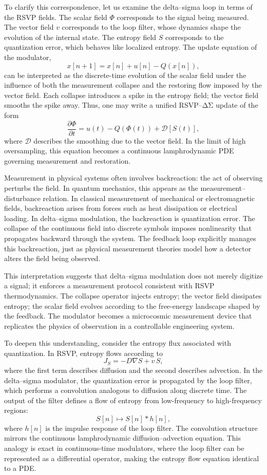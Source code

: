 To clarify this correspondence, let us examine the delta–sigma loop in terms of the RSVP fields. The scalar field \(\Phi\) corresponds to the signal being measured. The vector field \(v\) corresponds to the loop filter, whose dynamics shape the evolution of the internal state. The entropy field \(S\) corresponds to the quantization error, which behaves like localized entropy. The update equation of the modulator,
\[
x[n+1] = x[n] + u[n] - Q(x[n]),
\]
can be interpreted as the discrete-time evolution of the scalar field under the influence of both the measurement collapse and the restoring flow imposed by the vector field. Each collapse introduces a spike in the entropy field; the vector field smooths the spike away. Thus, one may write a unified RSVP–ΔΣ update of the form
\[
\frac{\partial \Phi}{\partial t} = u(t) - Q(\Phi(t)) + \mathcal{D}[S(t)],
\]
where \(\mathcal{D}\) describes the smoothing due to the vector field. In the limit of high oversampling, this equation becomes a continuous lamphrodynamic PDE governing measurement and restoration.

Measurement in physical systems often involves backreaction: the act of observing perturbs the field. In quantum mechanics, this appears as the measurement–disturbance relation. In classical measurement of mechanical or electromagnetic fields, backreaction arises from forces such as heat dissipation or electrical loading. In delta–sigma modulation, the backreaction is quantization error. The collapse of the continuous field into discrete symbols imposes nonlinearity that propagates backward through the system. The feedback loop explicitly manages this backreaction, just as physical measurement theories model how a detector alters the field being observed.

This interpretation suggests that delta–sigma modulation does not merely digitize a signal; it enforces a measurement protocol consistent with RSVP thermodynamics. The collapse operator injects entropy; the vector field dissipates entropy; the scalar field evolves according to the free-energy landscape shaped by the feedback. The modulator becomes a microcosmic measurement device that replicates the physics of observation in a controllable engineering system.

To deepen this understanding, consider the entropy flux associated with quantization. In RSVP, entropy flows according to
\[
J_{S} = - D \nabla S + v\,S,
\]
where the first term describes diffusion and the second describes advection. In the delta–sigma modulator, the quantization error is propagated by the loop filter, which performs a convolution analogous to diffusion along discrete time. The output of the filter defines a flow of entropy from low-frequency to high-frequency regions:
\[
S[n] \mapsto S[n] * h[n],
\]
where \(h[n]\) is the impulse response of the loop filter. The convolution structure mirrors the continuous lamphrodynamic diffusion–advection equation. This analogy is exact in continuous-time modulators, where the loop filter can be represented as a differential operator, making the entropy flow equation identical to a PDE.

